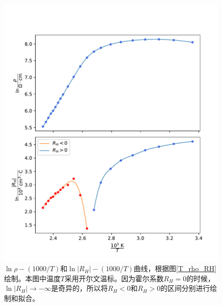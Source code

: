 \documentclass[font=default]{mpltx}
\begin{document}
\begin{figure}[h]
  \centering
  \setlength{\abovecaptionskip}{-0.4cm}
  \includegraphics[width=0.8\linewidth]{fig/Tln_rho_RH.pdf}
  \caption{$\ln\rho-(1000/T)$和$\ln |R_H|-(1000/T)$曲线，根据图\ref{T_rho_RH}绘制。本图中温度$T$采用开尔文温标。因为霍尔系数$R_H=0$的时候，$\ln|R_H|\to-\infty$是奇异的，所以将$R_H<0$和$R_H>0$的区间分别进行绘制和拟合。}
  \label{Tln_rho_RH}
\end{figure}
\end{document}
